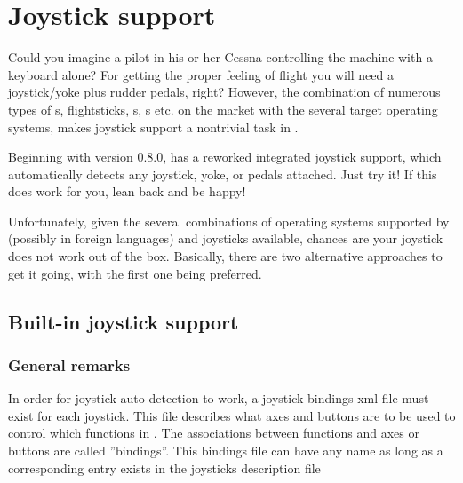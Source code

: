 \section{Joystick support\label{joysticksupp}}
Could you imagine a pilot in his or her Cessna controlling the machine with
a keyboard alone? For getting the proper feeling of flight you will need a
joystick/yoke plus rudder pedals, right? However, the combination of
numerous types of s, flightsticks, s,
s etc. on the market with the several target operating systems,
makes joystick support a nontrivial task in \FlightGear{}$\!$.

Beginning with version 0.8.0, \FlightGear{} has a reworked integrated
joystick support, which automatically detects any joystick, yoke, or pedals
attached. Just try it! If this does work for you, lean back and be happy!

Unfortunately, given the several combinations of operating systems supported
by \FlightGear{} (possibly in foreign languages) and joysticks available,
chances are your joystick does not work out of the box. Basically, there are
two alternative approaches to get it going, with the first one being
preferred.


\subsection{Built-in joystick support\label{joystickbuiltin}}

\subsubsection{General remarks\label{generalremarks}}
In order for joystick auto-detection to work, a joystick bindings xml file
must exist for each joystick. This file describes what axes and buttons are
to be used to control which functions in \FlightGear{}.  The associations
between functions and axes or buttons are called ''bindings''.  This
bindings file can have any name as long as a corresponding entry exists in
the joysticks description file
\medskip

